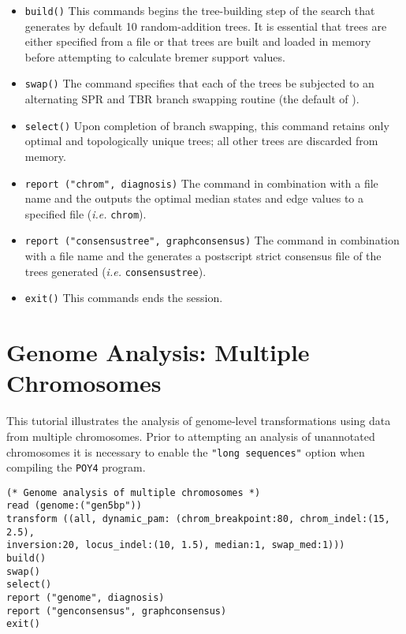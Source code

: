\begin{itemize}
\item \texttt{build()} This commands begins the tree-building step of the search that generates by default 10 random-addition trees.  It is essential that trees are either specified from a file or that trees are built and loaded in memory before attempting to calculate bremer support values.
\item \texttt{swap()} The  command specifies that each of the trees be subjected to an alternating SPR and TBR branch swapping routine (the default of \poy).
\item \texttt{select()} Upon completion of branch swapping, this command retains only optimal and topologically unique trees; all other trees are discarded from memory. 
\item \texttt{report ("chrom", diagnosis)}  The  command in combination with a file name and the  outputs the optimal median states and edge values to a specified file (\emph{i.e.} \texttt{chrom}). 
\item \texttt{report ("consensustree", graphconsensus)}  The  command in combination with a file name and the  generates a postscript strict consensus file of the trees generated (\emph{i.e.} \texttt{consensustree}). 
\item \texttt{exit()} This commands ends the \poy session.
\end{itemize}


\section{Genome Analysis: Multiple Chromosomes}{\label{tutorial 6}}

This tutorial illustrates the analysis of genome-level transformations using data from multiple chromosomes. 
Prior to attempting an analysis of unannotated chromosomes it is necessary to enable the \texttt {"long sequences"}
option when compiling the \texttt{POY4} program. 

\begin{verbatim}
(* Genome analysis of multiple chromosomes *)
read (genome:("gen5bp"))
transform ((all, dynamic_pam: (chrom_breakpoint:80, chrom_indel:(15, 2.5), 
inversion:20, locus_indel:(10, 1.5), median:1, swap_med:1)))
build()
swap()
select()
report ("genome", diagnosis)
report ("genconsensus", graphconsensus)
exit()
\end{verbatim}


